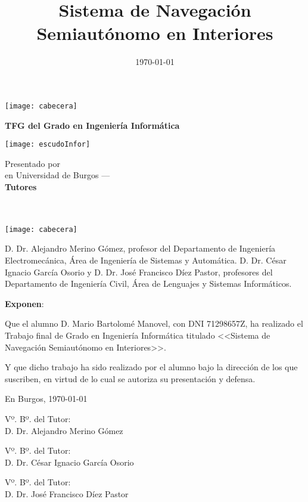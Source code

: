 \documentclass[a4paper,11pt,oneside]{memoir}
\title{Sistema de Navegación Semiautónomo en Interiores}
\author{\nombre}
\date{\today}
\makeatletter
\newcommand{\tutor}[1]{\def\@tutor{#1}}
\newcommand{\cotutorOne}[1]{\def\@cotutorOne{#1}}
\newcommand{\cotutorTwo}[1]{\def\@cotutorTwo{#1}}
\def\maketitle{
  \null
  \thispagestyle{empty}
\noindent\texttt{[image: cabecera]}\vspace{1cm}%
  \vfill
  \colorbox{cpardoBox}{%
    \begin{minipage}{.9\textwidth}
      \vspace{.5cm}\large
      \begin{center}
      \textbf{TFG del Grado en Ingeniería Informática}\vspace{.6cm}\\
      \textbf{\@title{}}
      \end{center}
      \vspace{.2cm}
    \end{minipage}

  }%
  \hfill\begin{minipage}{.20\textwidth}
    \texttt{[image: escudoInfor]}
  \end{minipage}
  \vfill
  \begin{center}%
  {%
    \noindent\large
    Presentado por \@author{}\\ 
    en Universidad de Burgos --- \@date{}\vspace{.6cm}\\
    \noindent \textbf{Tutores}\\[.5em]
    \@tutor{}\\
    \@cotutorOne{}\\
    \@cotutorTwo{}
  }%
  \end{center}%
  \null
  \cleardoublepage
  }
\newcommand{\nombre}{Mario Bartolomé Manovel} %
\makeatother
\begin{document}
\maketitle
\def\titulo{Sistema de Navegación Semiautónomo en Interiores}
\def\tutor{Dr. Alejandro Merino Gómez}
\def\cotutorOne{Dr. César Ignacio García Osorio}
\def\cotutorTwo{Dr. José Francisco Díez Pastor}
\newpage\null\thispagestyle{empty}\newpage


\thispagestyle{empty}


\noindent\texttt{[image: cabecera]}\vspace{1cm}

\noindent D. \tutor, profesor del Departamento de Ingeniería Electromecánica, Área de Ingeniería de Sistemas y Automática. D. \cotutorOne{} y D. \cotutorTwo{}, profesores del Departamento de Ingeniería Civil, Área de Lenguajes y Sistemas Informáticos.

\noindent \textbf{Exponen}:

\noindent Que el alumno D. \nombre, con DNI 71298657Z, ha realizado el Trabajo final de Grado en Ingeniería Informática titulado <<\titulo>>. 

\noindent Y que dicho trabajo ha sido realizado por el alumno bajo la dirección de los que suscriben, en virtud de lo cual se autoriza su presentación y defensa. 

\begin{center} %
En Burgos, {\large \today}
\end{center}

\vfill\vfill\vfill


\begin{minipage}{0.3\textwidth}
\raggedright
Vº. Bº. del Tutor:\\[2cm]
D. \tutor
\end{minipage}
\hfill
\begin{minipage}{0.3\textwidth}
\centering
Vº. Bº. del Tutor:\\[2cm]
D. \cotutorOne
\end{minipage}
\hfill
\begin{minipage}{0.3\textwidth}
\raggedleft
Vº. Bº. del Tutor:\\[2cm]
D. \cotutorTwo
\end{minipage}
\hfill
\vfill

%
\end{document}
